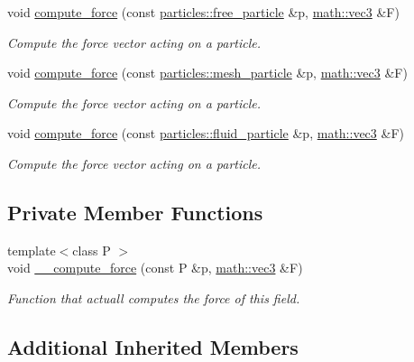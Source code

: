 \begin{DoxyCompactItemize}
void \hyperlink{classphysim_1_1fields_1_1gravitational__planet_ab272f7db84ad53d320d467b75d3f9ed2}{compute\+\_\+force} (const \hyperlink{classphysim_1_1particles_1_1free__particle}{particles\+::free\+\_\+particle} \&p, \hyperlink{structphysim_1_1math_1_1vec3}{math\+::vec3} \&F)
\begin{DoxyCompactList}\small\item\em Compute the force vector acting on a particle. \end{DoxyCompactList}\item 
void \hyperlink{classphysim_1_1fields_1_1gravitational__planet_aece6e4cc8679b3be5075c1e5fd1b3162}{compute\+\_\+force} (const \hyperlink{classphysim_1_1particles_1_1mesh__particle}{particles\+::mesh\+\_\+particle} \&p, \hyperlink{structphysim_1_1math_1_1vec3}{math\+::vec3} \&F)
\begin{DoxyCompactList}\small\item\em Compute the force vector acting on a particle. \end{DoxyCompactList}\item 
void \hyperlink{classphysim_1_1fields_1_1gravitational__planet_a3b79869e1411c333b21ba4a240574641}{compute\+\_\+force} (const \hyperlink{classphysim_1_1particles_1_1fluid__particle}{particles\+::fluid\+\_\+particle} \&p, \hyperlink{structphysim_1_1math_1_1vec3}{math\+::vec3} \&F)
\begin{DoxyCompactList}\small\item\em Compute the force vector acting on a particle. \end{DoxyCompactList}\end{DoxyCompactItemize}
\subsection*{Private Member Functions}
\begin{DoxyCompactItemize}
\item 
{\footnotesize template$<$class P $>$ }\\void \hyperlink{classphysim_1_1fields_1_1gravitational__planet_a5bb7992e6b6b03144262e0dfb3639f17}{\+\_\+\+\_\+compute\+\_\+force} (const P \&p, \hyperlink{structphysim_1_1math_1_1vec3}{math\+::vec3} \&F)
\begin{DoxyCompactList}\small\item\em Function that actuall computes the force of this field. \end{DoxyCompactList}\end{DoxyCompactItemize}
\subsection*{Additional Inherited Members}


